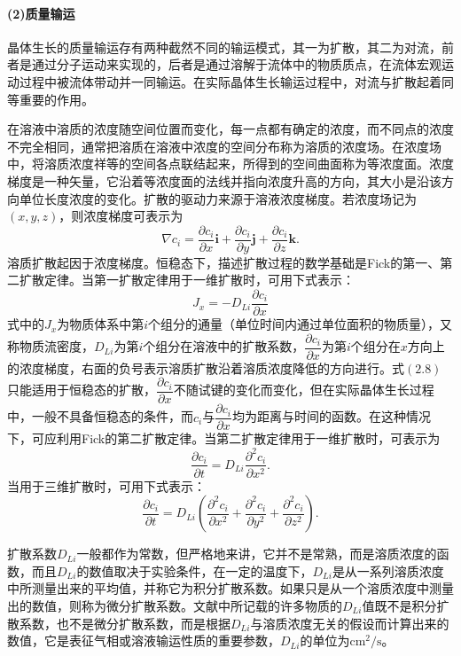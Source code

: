 \paragraph{(2)质量输运}晶体生长的质量输运存有两种截然不同的输运模式，其一为扩散，其二为对流，前者是通过分子运动来实现的，后者是通过溶解于流体中的物质质点，在流体宏观运动过程中被流体带动并一同输运。在实际晶体生长输运过程中，对流与扩散起着同等重要的作用。

在溶液中溶质的浓度随空间位置而变化，每一点都有确定的浓度，而不同点的浓度不完全相同，通常把溶质在溶液中浓度的空间分布称为溶质的浓度场。在浓度场中，将溶质浓度祥等的空间各点联结起来，所得到的空间曲面称为等浓度面。浓度梯度是一种矢量，它沿着等浓度面的法线并指向浓度升高的方向，其大小是沿该方向单位长度浓度的变化。扩散的驱动力来源于溶液浓度梯度。若浓度场记为$(x,y,z)$，则浓度梯度可表示为
\begin{equation}
\nabla c_i=\frac{\partial c_i}{\partial x} \bm{i}+ \frac{\partial c_i}{\partial y} \bm{j}+ \frac{\partial c_i}{\partial z} \bm{k}.
\end{equation}
溶质扩散起因于浓度梯度。恒稳态下，描述扩散过程的数学基础是Fick的第一、第二扩散定律。当第一扩散定律用于一维扩散时，可用下式表示：
\begin{equation}
J_x=-D_{Li}\frac{\partial c_i}{\partial x}
\end{equation}
式中的$J_x$为物质体系中第$i$个组分的通量（单位时间内通过单位面积的物质量），又称物质流密度，$D_{Li}$为第$i$个组分在溶液中的扩散系数，$\dfrac{\partial c_i}{\partial x}$为第$i$个组分在$x$方向上的浓度梯度，右面的负号表示溶质扩散沿着溶质浓度降低的方向进行。式$(2.8)$只能适用于恒稳态的扩散，$\dfrac{\partial c_i}{\partial x}$不随试键的变化而变化，但在实际晶体生长过程中，一般不具备恒稳态的条件，而$c_i$与$\dfrac{\partial c_i}{\partial x}$均为距离与时间的函数。在这种情况下，可应利用Fick的第二扩散定律。当第二扩散定律用于一维扩散时，可表示为
\begin{equation}
\frac{\partial c_i}{\partial t} = D_{Li}\frac{\partial^2c_i}{\partial x^2}.
\end{equation}
当用于三维扩散时，可用下式表示：
\begin{equation}
\frac{\partial c_i}{\partial t} = D_{Li}(\frac{\partial^2c_i}{\partial x^2}+\frac{\partial^2c_i}{\partial y^2}+\frac{\partial^2c_i}{\partial z^2}).
\end{equation}

扩散系数$D_{Li}$一般都作为常数，但严格地来讲，它并不是常熟，而是溶质浓度的函数，而且$D_{Li}$的数值取决于实验条件，在一定的温度下，$D_{Li}$是从一系列溶质浓度中所测量出来的平均值，并称它为积分扩散系数。如果只是从一个溶质浓度中测量出的数值，则称为微分扩散系数。文献中所记载的许多物质的$D_{Li}$值既不是积分扩散系数，也不是微分扩散系数，而是根据$D_{Li}$与溶质浓度无关的假设而计算出来的数值，它是表征气相或溶液输运性质的重要参数，$D_{Li}$的单位为$\mathrm{cm^2/s}$。

